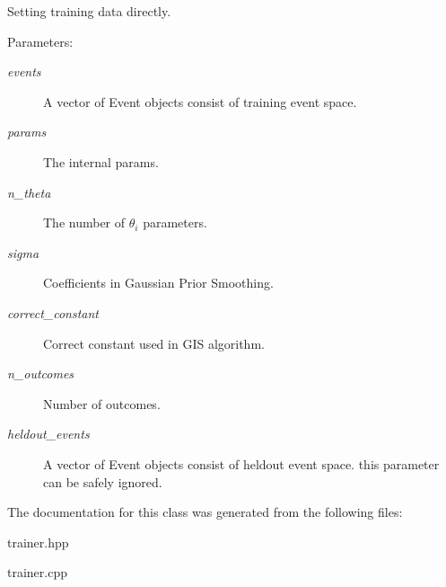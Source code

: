 Setting training data directly. 

\begin{Desc}
\item[Parameters:]
\begin{description}
\item[{\em events}]A vector of Event objects consist of training event space. \item[{\em params}]The internal params. \item[{\em n\_\-theta}]The number of $\theta_i $ parameters. \item[{\em sigma}]Coefficients in Gaussian Prior Smoothing. \item[{\em correct\_\-constant}]Correct constant used in GIS algorithm. \item[{\em n\_\-outcomes}]Number of outcomes. \item[{\em heldout\_\-events}]A vector of Event objects consist of heldout event space. this parameter can be safely ignored. \end{description}
\end{Desc}


The documentation for this class was generated from the following files:\begin{CompactItemize}
\item 
trainer.hpp\item 
trainer.cpp\end{CompactItemize}
